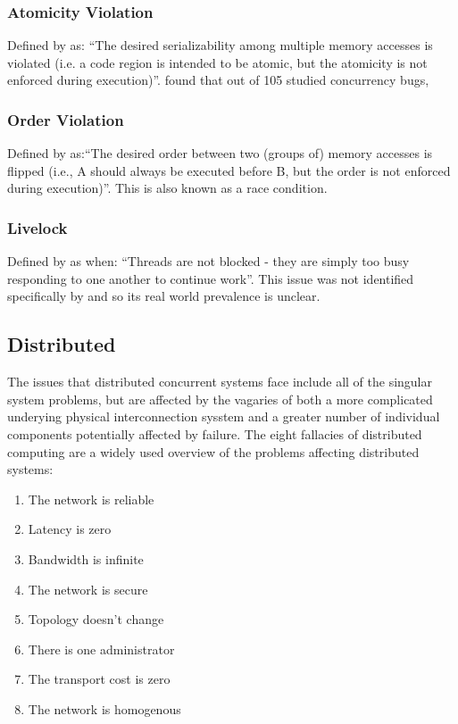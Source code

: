 \documentclass{sig-alternate}
\begin{document}
\subsubsection{Atomicity Violation}
Defined by \cite{shanlu08:_learn_mistak_compr_study_real} as: ``The desired serializability among multiple memory accesses is violated (i.e. a code region is intended to be atomic, but the atomicity is not enforced during execution)''. \cite{shanlu08:_learn_mistak_compr_study_real} found that out of 105 studied concurrency bugs, 

\subsubsection{Order Violation}
Defined by \cite{shanlu08:_learn_mistak_compr_study_real} as:``The desired order between two (groups of) memory accesses is flipped (i.e., A should always be executed before B, but the order is not enforced during execution)''. This is also known as a race condition. 

\subsubsection{Livelock}
Defined by \cite{oracle:_starv_livel} as when: ``Threads are not blocked - they are simply too busy responding to one another to continue work''. This issue was not identified specifically by \cite{shanlu08:_learn_mistak_compr_study_real} and so its real world prevalence is unclear.

\subsection{Distributed}
The issues that distributed concurrent systems face include all of the singular system problems, but are affected by the vagaries of both a more complicated underying physical interconnection sysstem and a greater number of individual components potentially affected by failure. The eight fallacies of distributed computing are a widely used overview of the problems affecting distributed systems:

\begin{enumerate}
\item The network is reliable
\item Latency is zero
\item Bandwidth is infinite
\item The network is secure
\item Topology doesn't change
\item There is one administrator
\item The transport cost is zero
\item The network is homogenous
\end{enumerate}
\end{document}
